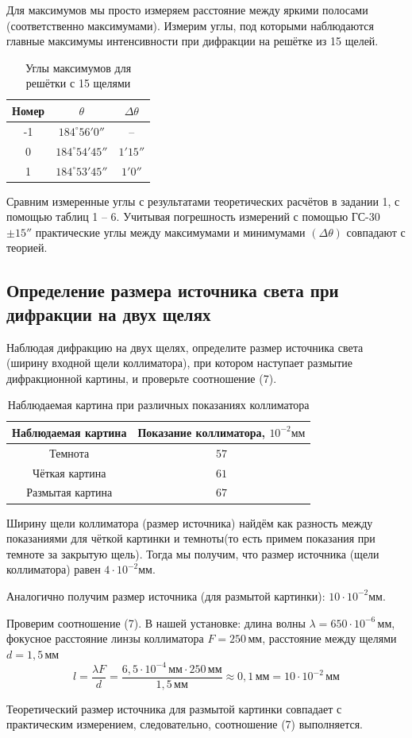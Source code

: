 Для максимумов мы просто измеряем расстояние между яркими полосами (соответственно максимумами).
Измерим углы, под которыми наблюдаются главные максимумы интенсивности при дифракции на решётке из 15 щелей.

\begin{table}[H]
	\centering
	\caption{Углы максимумов для решётки с 15 щелями}
	\begin{tabular}{ccc}
		\toprule
		Номер & $\theta$ & $\Delta \theta$ \\
		\midrule
		-1 & $ 184^\circ 56' 0''$  & -- \\
		0  & $ 184^\circ 54' 45''$ & $1' 15''$ \\
		1  & $ 184^\circ 53' 45''$ & $1' 0''$ \\
		\bottomrule
	\end{tabular}
	\label{tb:6}
\end{table}

Сравним измеренные углы с результатами теоретических расчётов в задании 1, с помощью таблиц 1 -- 6. Учитывая погрешность измерений с помощью ГС-30 $\pm15''$ практические углы между максимумами и минимумами $(\Delta \theta)$ совпадают с теорией.

\subsection{Определение размера источника света при дифракции на двух щелях}
Наблюдая дифракцию на двух щелях, определите размер источника света (ширину входной щели коллиматора), при котором наступает размытие дифракционной картины, и проверьте соотношение (7).

\begin{table}[H]
	\centering
	\caption{Наблюдаемая картина при различных показаниях коллиматора}
	\begin{tabular}{cc}
		\toprule
		Наблюдаемая картина & Показание коллиматора, $10^{-2} \text{мм}$ \\
		\midrule
		Темнота & $57$ \\
		Чёткая картина  & $61$  \\
		Размытая картина  &  $67$  \\
		\bottomrule
	\end{tabular}
\end{table}

Ширину щели коллиматора (размер источника) найдём как разность между показаниями для чёткой картинки и темноты(то есть примем показания при темноте за закрытую щель).  
Тогда мы получим, что размер источника (щели коллиматора) равен $4 \cdot 10^{-2} \text{мм}$.

Аналогично получим размер источника (для размытой картинки): $10 \cdot 10^{-2} \text{мм}$.

Проверим соотношение (7). В нашей установке:  длина волны $\lambda = 650 \cdot 10^{-6} \, \text{мм}$, фокусное расстояние линзы коллиматора $F = 250 \, \text{мм}$, расстояние между щелями $d = 1,5 \, \text{мм}$
\[
l = \frac{\lambda F}{d} = \frac{6,5 \cdot 10^{-4} \, \text{мм} \cdot 250 \, \text{мм}}{1,5 \, \text{мм}} \approx 0,1 \, \text{мм} = 10 \cdot 10^{-2} \, \text{мм}
\]

Теоретический размер источника для размытой картинки совпадает с практическим измерением, следовательно, соотношение (7) выполняется.
